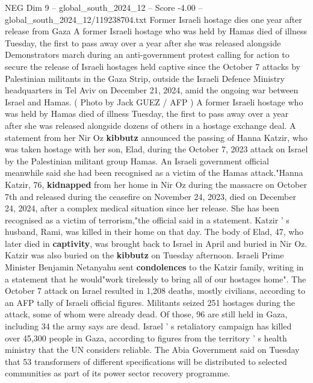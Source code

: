 \begin{textsample}{NEG Dim 9 – global\_south\_2024\_12 – Score -4.00 – global\_south\_2024\_12/119238704.txt}  \label{ex:f9_neg_217}
Former Israeli hostage dies one year after release from Gaza A former Israeli hostage who was held by Hamas died of illness Tuesday, the first to pass away over a year after she was released alongside Demonstrators march during an anti-government protest calling for action to secure the release of Israeli hostages held captive since the October 7 attacks by Palestinian militants in the Gaza Strip, outside the Israeli Defence Ministry headquarters in Tel Aviv on December 21, 2024, amid the ongoing war between Israel and Hamas. ( Photo by Jack GUEZ / AFP ) A former Israeli hostage who was held by Hamas died of illness Tuesday, the first to pass away over a year after she was released alongside dozens of others in a hostage exchange deal.
A statement from her Nir Oz \textbf{kibbutz} announced the passing of Hanna Katzir, who was taken hostage with her son, Elad, during the October 7, 2023 attack on Israel by the Palestinian militant group Hamas.
An Israeli government official meanwhile said she had been recognised as a victim of the Hamas attack."Hanna Katzir, 76, \textbf{kidnapped} from her home in Nir Oz during the massacre on October 7th and released during the ceasefire on November 24, 2023, died on December 24, 2024, after a complex medical situation since her release.
She has been recognised as a victim of terrorism,"the official said in a statement.
Katzir ' s husband, Rami, was killed in their home on that day.
The body of Elad, 47, who later died in \textbf{captivity}, was brought back to Israel in April and buried in Nir Oz.
Katzir was also buried on the \textbf{kibbutz} on Tuesday afternoon.
Israeli Prime Minister Benjamin Netanyahu sent \textbf{condolences} to the Katzir family, writing in a statement that he would"work tirelessly to bring all of our hostages home".
The October 7 attack on Israel resulted in 1,208 deaths, mostly civilians, according to an AFP tally of Israeli official figures.
Militants seized 251 hostages during the attack, some of whom were already dead.
Of those, 96 are still held in Gaza, including 34 the army says are dead.
Israel ' s retaliatory campaign has killed over 45,300 people in Gaza, according to figures from the territory ' s health ministry that the UN considers reliable.
The Abia Government said on Tuesday that 53 transformers of different specifications will be distributed to selected communities as part of its power sector recovery programme.

\end{textsample}
